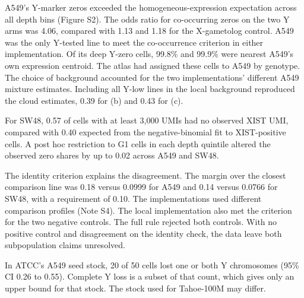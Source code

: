 \documentclass[
  11pt,
  letterpaper,
]{article}
\begin{document}
A549's Y-marker zeros exceeded the homogeneous-expression expectation
across all depth bins (Figure S2). The odds ratio for co-occurring zeros
on the two Y arms was 4.06, compared with 1.13 and 1.18 for the
X-gametolog control. A549 was the only Y-tested line to meet the
co-occurrence criterion in either implementation. Of its deep Y-zero
cells, 99.8\% and 99.9\% were nearest A549's own expression centroid.
The atlas had assigned these cells to A549 by genotype. The choice of
background accounted for the two implementations' different A549 mixture
estimates. Including all Y-low lines in the local background reproduced
the cloud estimates, 0.39 for (b) and 0.43 for (c).

For SW48, 0.57 of cells with at least 3,000 UMIs had no observed XIST
UMI, compared with 0.40 expected from the negative-binomial fit to
XIST-positive cells. A post hoc restriction to G1 cells in each depth
quintile altered the observed zero shares by up to 0.02 across A549 and
SW48.

The identity criterion explains the disagreement. The margin over the
closest comparison line was 0.18 versus 0.0999 for A549 and 0.14 versus
0.0766 for SW48, with a requirement of 0.10. The implementations used
different comparison profiles (Note S4). The local implementation also
met the criterion for the two negative controls. The full rule rejected
both controls. With no positive control and disagreement on the identity
check, the data leave both subpopulation claims unresolved.

In ATCC's A549 seed stock, 20 of 50 cells lost one or both Y chromosomes
(95\% CI 0.26 to 0.55). Complete Y loss is a subset of that count, which
gives only an upper bound for that stock. The stock used for Tahoe-100M
may differ.
\end{document}
